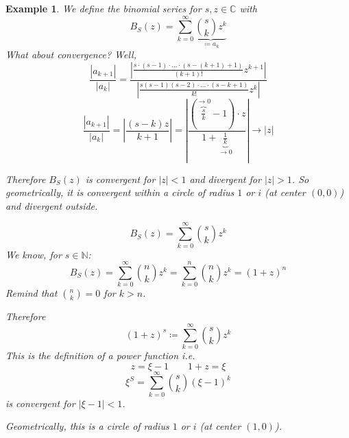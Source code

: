 \documentclass[a4paper,landscape,twocolumn]{article}
\newtheorem{ex}{Example}
\newcommand\abs[1]{\left|#1\right|}
\begin{document}
\begin{ex}
  We define the binomial series for $s,z \in \mathbb C$ with
  \[ B_S(z) = \sum_{k=0}^\infty \underbrace{{s \choose k} z^k}_{\coloneqq a_k} \]
  What about convergence? Well,
  \[ \frac{\abs{a_{k+1}}}{\abs{a_k}} = \frac{\abs{\frac{s \cdot (s-1) \cdot \ldots \cdot (s-(k+1)+1)}{(k+1)!} z^{k+1}}}{\abs{\frac{s(s-1)(s-2)\cdot \ldots\cdot (s-k+1)}{k!} z^k}} \]
  \[ \frac{\abs{a_{k+1}}}{\abs{a_k}} = \abs{\frac{(s-k) z}{k+1}} = \abs{\frac{\left(\overbrace{\frac{s}{k}}^{\to 0} - 1\right) \cdot z}{1 + \underbrace{\frac1k}_{\to0}}} \to \abs{z} \]

  Therefore $B_S(z)$ is convergent for $\abs{z} < 1$ and divergent for $\abs{z} > 1$.
  So geometrically, it is convergent within a circle of radius $1$ or $i$ (at center $(0,0)$) and divergent outside.

  \[ B_S(z) = \sum_{k=0}^\infty {s \choose k} z^k \]
  We know, for $s \in \mathbb N$:
  \[ B_S(z) = \sum_{k=0}^\infty {n \choose k} z^k = \sum_{k=0}^n {n \choose k} z^k = (1 + z)^n \]
  Remind that ${n \choose k} = 0$ for $k > n$.

  Therefore
  \[ (1 + z)^s \coloneqq \sum_{k=0}^\infty {s \choose k} z^k \]
  This is the definition of a power function i.e.
  \[ z = \xi - 1 \qquad 1 + z = \xi \]
  \[ \xi^S = \sum_{k=0}^\infty {s \choose k} (\xi - 1)^k \]
  is convergent for $\abs{\xi - 1} < 1$.

  Geometrically, this is a circle of radius $1$ or $i$ (at center $(1,0)$).
\end{ex}
\end{document}
